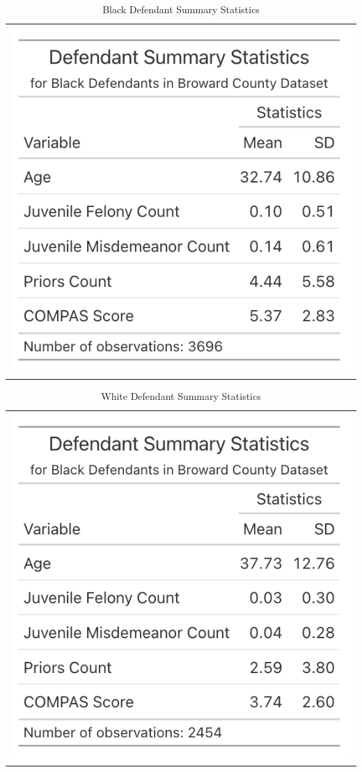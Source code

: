 \documentclass[12pt, ]{article}
\begin{document}
\hypertarget{tbl-7}{}
\begin{longtable}[]{@{}l@{}}
\caption{\label{tbl-7}Black Defendant Summary Statistics}\tabularnewline
\toprule\noalign{}
\endfirsthead
\endhead
\bottomrule\noalign{}
\endlastfoot
\includegraphics{tables/tbl7.png} \\
\end{longtable}

\hypertarget{tbl-8}{}
\begin{longtable}[]{@{}l@{}}
\caption{\label{tbl-8}White Defendant Summary Statistics}\tabularnewline
\toprule\noalign{}
\endfirsthead
\endhead
\bottomrule\noalign{}
\endlastfoot
\includegraphics{tables/tbl8.png} \\
\end{longtable}

\end{document}
